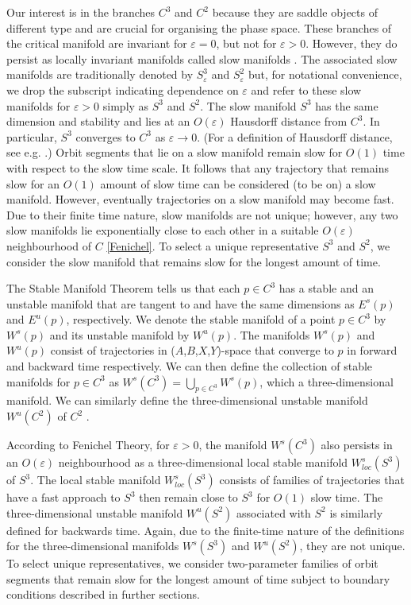 \documentclass{ws-ijbc}
\begin{document}
Our interest is in the branches $C^3$ and $C^2$ because they are saddle objects of different type and are crucial for organising the phase space.  These branches of the critical manifold are invariant for $\varepsilon = 0$, but not for $\varepsilon > 0$.  However, they do persist as locally invariant manifolds called slow manifolds \cite{Fenichel}.  The associated slow manifolds are traditionally denoted by $S^3_\varepsilon$ and $S^2_\varepsilon$ but, for notational convenience, we drop the subscript indicating dependence on $\varepsilon$ and refer to these slow manifolds for $\varepsilon > 0$ simply as $S^3$ and $S^2$.  The slow manifold $S^3$ has the same dimension and stability and lies at an $O(\varepsilon)$ Hausdorff distance from $C^3$.  In particular, $S^3$ converges to $C^3$ as $\varepsilon \rightarrow 0$.  (For a definition of Hausdorff distance, see e.g. \cite{Hausdorff_Distance}.)  Orbit segments that lie on a slow manifold remain slow for $O(1)$ time with respect to the slow time scale.  It follows that any trajectory that remains slow for an $O(1)$ amount of slow time can be considered (to be on) a slow manifold.  However, eventually trajectories on a slow manifold may become fast. Due to their finite time nature, slow manifolds are not unique; however, any two slow manifolds lie exponentially close to each other in a suitable $O(\varepsilon)$ neighbourhood of $C$ \ref{Fenichel}.  To select a unique representative $S^3$ and $S^2$, we consider the slow manifold that remains slow for the longest amount of time.

The Stable Manifold Theorem tells us that each $p \in C^3$ has a stable and an unstable manifold that are tangent to and have the same dimensions as $E^{s}(p)$ and $E^{u}(p)$, respectively.  We denote the stable manifold of a point $p \in C^3$ by $W^{s}(p)$ and its unstable manifold by $W^{u}(p)$.  The manifolds $W^{s}(p)$ and $W^{u}(p)$ consist of trajectories in ($A$,$B$,$X$,$Y$)-space that converge to $p$ in forward and backward time respectively.  We can then define the collection of stable manifolds for $p \in C^3$ as $W^{s}(C^3) = \bigcup_{p \in C^3} W^{s}(p)$, which a three-dimensional manifold.  We can similarly define the three-dimensional unstable manifold $W^{u}(C^2)$ of $C^2$ .

According to Fenichel Theory, for $\varepsilon > 0$, the manifold $W^{s}(C^3)$ also persists in an $O(\varepsilon)$ neighbourhood as a three-dimensional local stable manifold $W^{s}_{loc}(S^3)$ of $S^3$.  The local stable manifold $W^{s}_{loc}(S^3)$ consists of families of trajectories that have a fast approach to $S^3$ then remain close to $S^3$ for $O(1)$ slow time.  The three-dimensional unstable manifold $W^{u}(S^2)$ associated with $S^2$ is similarly defined for backwards time.  Again, due to the finite-time nature of the definitions for the three-dimensional manifolds $W^{s}(S^3)$ and $W^{u}(S^2)$, they are not unique.  To select unique representatives, we consider two-parameter families of orbit segments that remain slow for the longest amount of time subject to boundary conditions described in further sections.  
 
\end{document}
